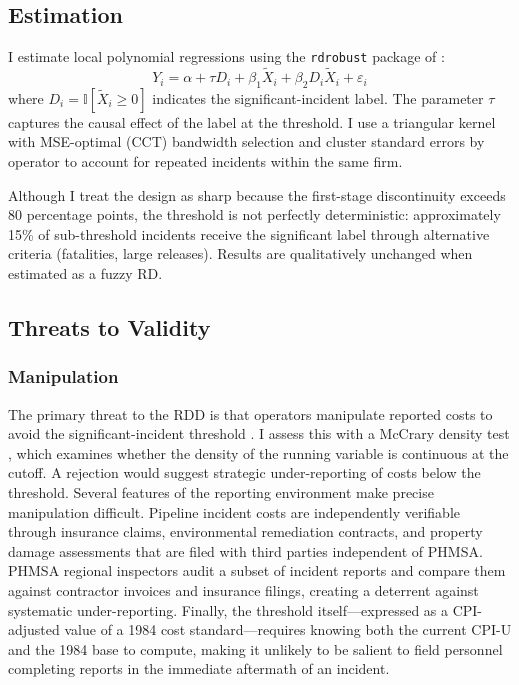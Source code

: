 \documentclass[12pt]{article}
\newcommand{\ind}{\mathbb{I}}
\begin{document}
\subsection{Estimation}

I estimate local polynomial regressions using the \texttt{rdrobust} package of \citet{calonico2014robust}:
\begin{equation}
Y_i = \alpha + \tau D_i + \beta_1 \widetilde{X}_i + \beta_2 D_i \widetilde{X}_i + \varepsilon_i
\end{equation}
where $D_i = \ind[\widetilde{X}_i \geq 0]$ indicates the significant-incident label. The parameter $\tau$ captures the causal effect of the label at the threshold. I use a triangular kernel with MSE-optimal (CCT) bandwidth selection \citep{calonico2020optimal} and cluster standard errors by operator to account for repeated incidents within the same firm.

Although I treat the design as sharp because the first-stage discontinuity exceeds 80 percentage points, the threshold is not perfectly deterministic: approximately 15\% of sub-threshold incidents receive the significant label through alternative criteria (fatalities, large releases). Results are qualitatively unchanged when estimated as a fuzzy RD.

\subsection{Threats to Validity}

\subsubsection*{Manipulation} The primary threat to the RDD is that operators manipulate reported costs to avoid the significant-incident threshold \citep{mccrary2008manipulation}. I assess this with a McCrary density test \citep{cattaneo2020simple}, which examines whether the density of the running variable is continuous at the cutoff. A rejection would suggest strategic under-reporting of costs below the threshold. Several features of the reporting environment make precise manipulation difficult. Pipeline incident costs are independently verifiable through insurance claims, environmental remediation contracts, and property damage assessments that are filed with third parties independent of PHMSA. PHMSA regional inspectors audit a subset of incident reports and compare them against contractor invoices and insurance filings, creating a deterrent against systematic under-reporting. Finally, the threshold itself---expressed as a CPI-adjusted value of a 1984 cost standard---requires knowing both the current CPI-U and the 1984 base to compute, making it unlikely to be salient to field personnel completing reports in the immediate aftermath of an incident.
\end{document}
